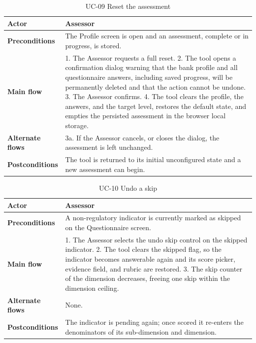 \begin{table}[H]
\centering
\caption{UC-09 Reset the assessment}
\label{tab:uc09}
\begin{tabular}{|p{3cm}|p{12cm}|}
\hline
\textbf{Actor} & Assessor \\
\hline
\textbf{Preconditions} & The Profile screen is open and an assessment, complete or in progress, is stored. \\
\hline
\textbf{Main flow} & 1. The Assessor requests a full reset. 2. The tool opens a confirmation dialog warning that the bank profile and all questionnaire answers, including saved progress, will be permanently deleted and that the action cannot be undone. 3. The Assessor confirms. 4. The tool clears the profile, the answers, and the target level, restores the default state, and empties the persisted assessment in the browser local storage. \\
\hline
\textbf{Alternate flows} & 3a. If the Assessor cancels, or closes the dialog, the assessment is left unchanged. \\
\hline
\textbf{Postconditions} & The tool is returned to its initial unconfigured state and a new assessment can begin. \\
\hline
\end{tabular}
\end{table}

\begin{table}[H]
\centering
\caption{UC-10 Undo a skip}
\label{tab:uc10}
\begin{tabular}{|p{3cm}|p{12cm}|}
\hline
\textbf{Actor} & Assessor \\
\hline
\textbf{Preconditions} & A non-regulatory indicator is currently marked as skipped on the Questionnaire screen. \\
\hline
\textbf{Main flow} & 1. The Assessor selects the undo skip control on the skipped indicator. 2. The tool clears the skipped flag, so the indicator becomes answerable again and its score picker, evidence field, and rubric are restored. 3. The skip counter of the dimension decreases, freeing one skip within the dimension ceiling. \\
\hline
\textbf{Alternate flows} & None. \\
\hline
\textbf{Postconditions} & The indicator is pending again; once scored it re-enters the denominators of its sub-dimension and dimension. \\
\hline
\end{tabular}
\end{table}

